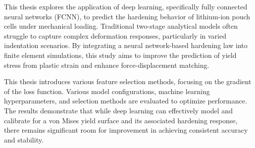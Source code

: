 This thesis explores the application of deep learning, specifically fully connected neural networks (FCNN), to predict the hardening behavior of lithium-ion pouch cells under mechanical loading. Traditional two-stage analytical models often struggle to capture complex deformation responses, particularly in varied indentation scenarios. By integrating a neural network-based hardening law into finite element simulations, this study aims to improve the prediction of yield stress from plastic strain and enhance force-displacement matching.

This thesis introduces various feature selection methods, focusing on the gradient of the loss function. Various model configurations, machine learning hyperparameters, and selection methods are evaluated to optimize performance. The results demonstrate that while deep learning can effectively model and calibrate for a von Mises yield surface and its associated hardening response, there remains significant room for improvement in achieving consistent accuracy and stability.

